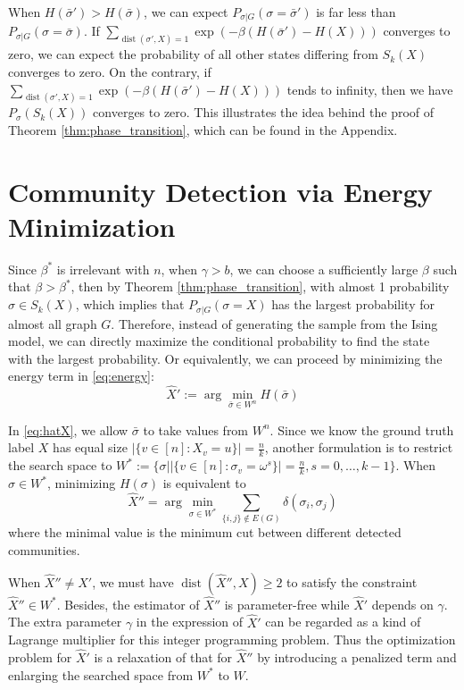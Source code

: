 \documentclass[journal]{IEEEtran}
\newcommand{\1}{\mathbbm{1}}
\DeclareMathOperator{\dist}{dist}
\begin{document}
When $H(\bar{\sigma}') > H(\bar{\sigma})$, we can expect $P_{\sigma | G}(\sigma = \bar{\sigma}')$ is far less than 
$P_{\sigma | G}(\sigma = \bar{\sigma})$.
If  $ \sum_{\dist(\sigma', X)=1}\exp(-\beta(H(\bar{\sigma}') - H(X))) $ converges to zero,
we can expect the probability of all other states differing from $S_k(X)$ converges to zero.
On the contrary, if $ \sum_{\dist(\sigma', X)=1}\exp(-\beta(H(\bar{\sigma}') - H(X))) $ tends to infinity,
then we have $P_{\sigma}(S_k(X))$ converges to zero. This illustrates the idea behind
the proof of
Theorem \ref{thm:phase_transition}, which can be found in the Appendix.


\section{Community Detection via Energy Minimization}\label{sec:em}
Since $\beta^*$ is irrelevant with $n$, when $\gamma>b$, we can choose a sufficiently large $\beta$ such that
$\beta > \beta^*$, then by Theorem \ref{thm:phase_transition}, with almost 1 probability $\sigma \in S_k(X)$, which
implies that $P_{\sigma | G}(\sigma = X)$ has the largest probability for almost all graph $G$. Therefore, instead of generating
the sample from the Ising model, we can directly maximize the conditional probability to find the state with the largest probability.
Or equivalently, we can proceed by minimizing the energy term in \eqref{eq:energy}:
\begin{equation}\label{eq:hatX}
\hat{X}' := \arg\min_{\bar{\sigma} \in W^n} H(\bar{\sigma})
\end{equation}

In \eqref{eq:hatX}, we allow $\bar{\sigma}$ to take values from $W^n$. Since we know the ground truth label $X$ has equal
size $|\{v \in [n] : X_v = u\}| = \frac{n}{k}$, another formulation is to restrict the search space to
$W^*:= \{\sigma \big\vert |\{v \in [n] : \sigma_v = \omega^s\}| = \frac{n}{k}, s=0,\dots, k-1 \}$.
When $\sigma \in W^*$, minimizing $H(\sigma)$ is equivalent to
\begin{equation}
\hat{X}'' = \arg\min_{\sigma \in W^*} \sum_{\{i,j\} \not\in E(G) } \delta(\sigma_i, \sigma_j)
\end{equation}
where the minimal value is the minimum cut between different detected communities.

When $\hat{X}'' \neq X'$, we must have $\dist(\hat{X}'' ,X)\geq 2$ to satisfy the constraint $\hat{X}'' \in W^*$.
Besides, the estimator of $\hat{X}''$ is parameter-free while $\hat{X}'$ depends on $\gamma$. The extra parameter $\gamma$ in the expression of
$\hat{X}'$ can be regarded as a kind of Lagrange multiplier for this integer programming problem. Thus the optimization problem for $\hat{X}'$
is a relaxation of that for $\hat{X}''$ by introducing a penalized term and enlarging the searched space from $W^*$ to $W$.
\end{document}

